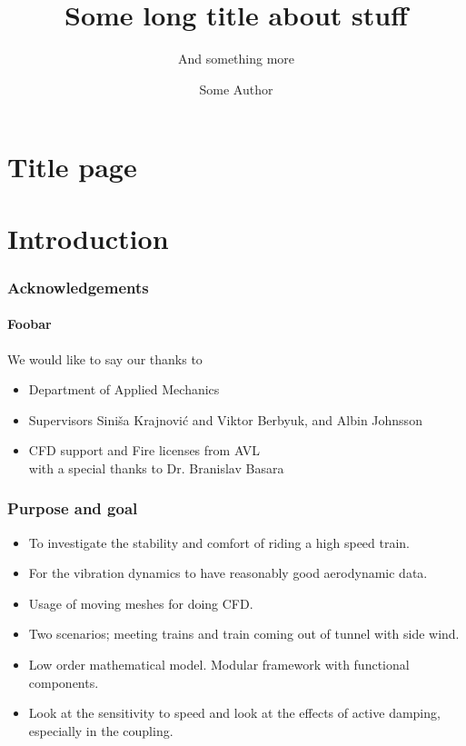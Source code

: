 \documentclass[12pt]{beamer}
\title{Some long title about stuff}
\subtitle{And something more}
\author{Some Author}
\institute{Chalmers University of Technology}
\begin{document}
\section{Title page}
\begin{frame}[plain]
 \titlepage
\end{frame}

\section{Introduction}
\begin{frame}
 \frametitle{Acknowledgements}
\framesubtitle{Foobar}

 We would like to say our thanks to
\begin{itemize}
 \item Department of Applied Mechanics
 \item Supervisors Sini\v{s}a Krajnovi\'{c} and Viktor Berbyuk, and Albin Johnsson
 \item CFD support and Fire licenses from AVL\\ with a special thanks to Dr. Branislav Basara
\end{itemize}
\end{frame}

\begin{frame}
 \frametitle{Purpose and goal}
 \begin{itemize}
  \item To investigate the stability and comfort of riding a high speed train.
  \item For the vibration dynamics to have reasonably good aerodynamic data.
  \item Usage of moving meshes for doing CFD.
  \item Two scenarios; meeting trains and train coming out of tunnel with side wind.
  \item Low order mathematical model. Modular framework with functional components.
  \item Look at the sensitivity to speed and look at the effects of active damping, especially in the coupling.
 \end{itemize}
\end{frame}
\end{document}
